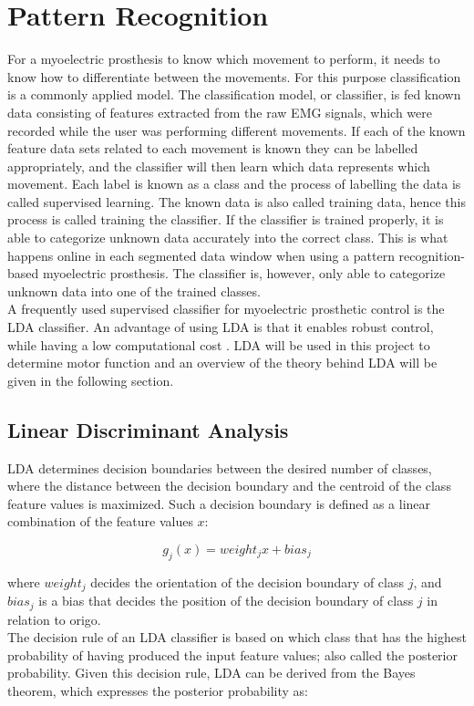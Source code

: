 \section{Pattern Recognition} \label{patter}
For a myoelectric prosthesis to know which movement to perform, it needs to know how to differentiate between the movements. For this purpose classification is a commonly applied model. The classification model, or classifier, is fed known data consisting of features extracted from the raw EMG signals, which were recorded while the user was performing different movements. If each of the known feature data sets related to each movement is known they can be labelled appropriately, and the classifier will then learn which data represents which movement. Each label is known as a class and the process of labelling the data is called supervised learning. The known data is also called training data, hence this process is called training the classifier. If the classifier is trained properly, it is able to categorize unknown data accurately into the correct class. This is what happens online in each segmented data window when using a pattern recognition-based myoelectric prosthesis. The classifier is, however, only able to categorize unknown data into one of the trained classes. \cite{Duda2000} \\
A frequently used supervised classifier for myoelectric prosthetic control is the LDA classifier. An advantage of using LDA is that it enables robust control, while having a low computational cost \cite{Englehart2003}. LDA will be used in this project to determine motor function and an overview of the theory behind LDA will be given in the following section.

\subsection{Linear Discriminant Analysis} \label{lda}
LDA determines decision boundaries between the desired number of classes, where the distance between the decision boundary and the centroid of the class feature values is maximized. Such a decision boundary is defined as a linear combination of the feature values $x$:

\begin{equation} \label{eq:LDAcommon}
	g_{j}(x) = weight_{j}x + bias_{j}
\end{equation}

where $weight_{j}$ decides the orientation of the decision boundary of class $j$, and $bias_{j}$ is a bias that decides the position of the decision boundary of class $j$ in relation to origo. \\
The decision rule of an LDA classifier is based on which class that has the highest probability of having produced the input feature values; also called the posterior probability. Given this decision rule, LDA can be derived from the Bayes theorem, which expresses the posterior probability as:

